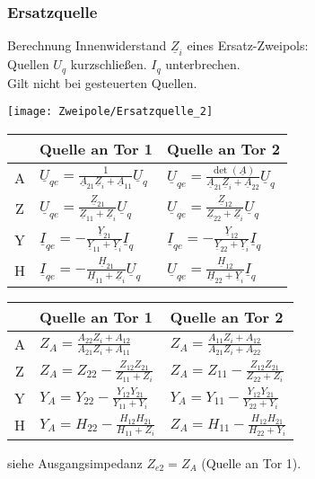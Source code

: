 \subsubsection{Ersatzquelle}
Berechnung Innenwiderstand $\underline{Z}_i$ eines Ersatz-Zweipols:\\ 
Quellen $U_q$ kurzschließen. $I_q$ unterbrechen.\\
Gilt nicht bei gesteuerten Quellen.\\
\begin{center}
	\texttt{[image: Zweipole/Ersatzquelle\_2]}
\end{center}
\begin{tabularx}{\columnwidth}{|c|X|X|}
	\hline
	 & Quelle an Tor 1 & Quelle an Tor 2 \\
	\hline A & $\underline{U}_{q e}=\frac{1}{\underline{A}_{21} \underline{Z}_i+\underline{A}_{11}} \underline{U}_q$ & $\underline{U}_{q e}=\frac{\operatorname{det}(\underline{A})}{\underline{A}_{21} \underline{Z}_i+\underline{A}_{22}} \underline{U}_q$ \\
	\hline Z & $\underline{U}_{q e}=\frac{\underline{Z}_{21}}{\underline{Z}_{11}+\underline{Z}_i} \underline{U}_q$ & $\underline{U}_{q e}=\frac{\underline{Z}_{12}}{\underline{Z}_{22}+\underline{Z}_i} \underline{U}_q$ \\
	\hline Y & $\underline{I}_{q e}=-\frac{\underline{Y}_{21}}{\underline{Y}_{11}+\underline{Y}_i} \underline{I}_q$ & $\underline{I}_{q e}=-\frac{\underline{Y}_{12}}{\underline{Y}_{22}+\underline{Y}_i} \underline{I}_q$ \\
	\hline H & $\underline{I}_{q e}=-\frac{\underline{H}_{21}}{\underline{H}_{11}+\underline{Z}_i} \underline{U}_q$ & $\underline{U}_{q e}=\frac{\underline{H}_{12}}{\underline{H}_{22}+\underline{Y}_i} \underline{I}_q$ \\
	\hline
\end{tabularx}
\begin{tabularx}{\columnwidth}{|c|X|X|}
	\hline
	        & Quelle an Tor 1 & Quelle an Tor 2 \\
	\hline
	A & $Z_A = \frac{A_{22}Z_i + A_{12}}{A_{21}Z_i + A_{11}}$ & $Z_A = \frac{A_{11}Z_i + A_{12}}{A_{21}Z_i + A_{22}}$ \\
	\hline
	Z & $Z_A = Z_{22} - \frac{Z_{12} Z_{21}}{Z_{11} + Z_i}$ & $Z_A = Z_{11} - \frac{Z_{12} Z_{21}}{Z_{22} + Z_i}$ \\
	\hline
	Y & $Y_A = Y_{22} - \frac{Y_{12} Y_{21}}{Y_{11} + Y_i}$ & $Y_A = Y_{11} - \frac{Y_{12} Y_{21}}{Y_{22} + Y_i}$ \\
	\hline
	H & $Y_A = H_{22} - \frac{H_{12} H_{21}}{H_{11} + Z_i}$ & $Z_A = H_{11} - \frac{H_{12} H_{21}}{H_{22} + Y_i}$ \\
	\hline
\end{tabularx}
siehe Ausgangsimpedanz $Z_{e2} = Z_A$ (Quelle an Tor 1).

